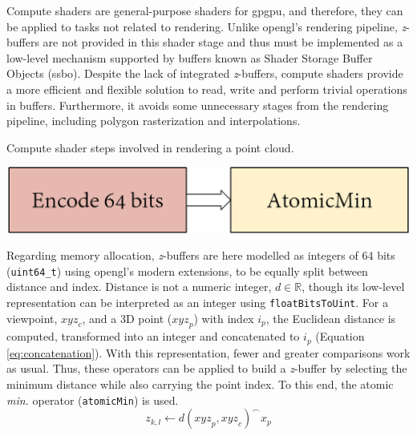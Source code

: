 Compute shaders are general-purpose shaders for \acrshort{gpgpu}, and therefore, they can be applied to tasks not related to rendering. Unlike \acrshort{opengl}'s rendering pipeline, \textit{z}-buffers are not provided in this shader stage and thus must be implemented as a low-level mechanism supported by buffers known as Shader Storage Buffer Objects (\acrshort{ssbo}). Despite the lack of integrated \textit{z}-buffers, compute shaders provide a more efficient and flexible solution to read, write and perform trivial operations in buffers. Furthermore, it avoids some unnecessary stages from the rendering pipeline, including polygon rasterization and interpolations. 

\begin{marginfigure}[.cm]
    \caption{Compute shader steps involved in rendering a point cloud.}
    \label{fig:occlusion_compute_shader_zbuffer_core}
    \includegraphics[width=\linewidth]{figs/multi_thermal_projection/occlusion_compute_shader_core.png}
\end{marginfigure}
Regarding memory allocation, \textit{z}-buffers are here modelled as integers of 64 bits (\verb|uint64_t|) using \acrshort{opengl}'s modern extensions, to be equally split between distance and index. Distance is not a numeric integer, $d \in \mathbb{R}$, though its low-level representation can be interpreted as an integer using \verb|floatBitsToUint|. For a viewpoint, $\textit{xyz}_c$, and a 3D point ($\textit{xyz}_p$) with index $i_p$, the Euclidean distance is computed, transformed into an integer and concatenated to $i_p$ (Equation \ref{eq:concatenation}). With this representation, fewer and greater comparisons work as usual. Thus, these operators can be applied to build a \textit{z}-buffer by selecting the minimum distance while also carrying the point index. To this end, the atomic \textit{min.} operator (\verb|atomicMin|) is used.
\begin{equation}
\label{eq:concatenation}
z_{k, l} \gets d(\textit{xyz}_p, \textit{xyz}_c) ^\frown x_p
\end{equation}

